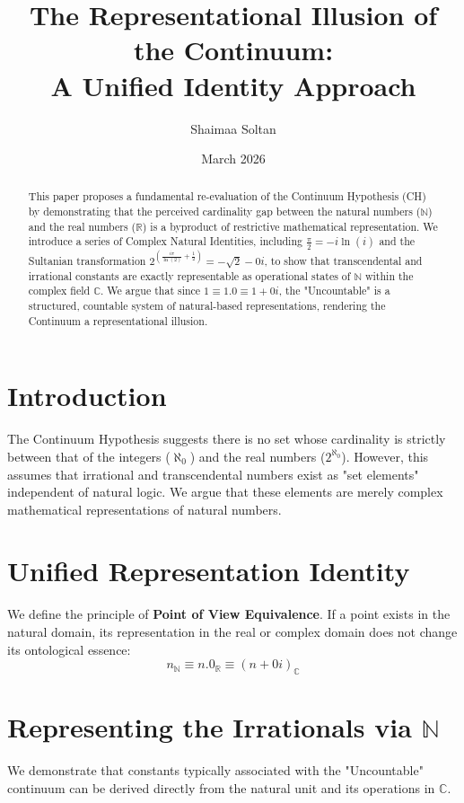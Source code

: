 \documentclass[12pt,a4paper]{article}
\title{The Representational Illusion of the Continuum: \\ A Unified Identity Approach}
\author{Shaimaa Soltan}
\date{March 2026}
\begin{document}
\maketitle

\begin{abstract}
This paper proposes a fundamental re-evaluation of the Continuum Hypothesis (CH) by demonstrating that the perceived cardinality gap between the natural numbers ($\mathbb{N}$) and the real numbers ($\mathbb{R}$) is a byproduct of restrictive mathematical representation. We introduce a series of Complex Natural Identities, including $\frac{\pi}{2} = -i \ln(i)$ and the Sultanian transformation $2^{(\frac{i\pi}{\ln(2)} + \frac{1}{2})} = -\sqrt{2}-0i$, to show that transcendental and irrational constants are exactly representable as operational states of $\mathbb{N}$ within the complex field $\mathbb{C}$. We argue that since $1 \equiv 1.0 \equiv 1+0i$, the "Uncountable" is a structured, countable system of natural-based representations, rendering the Continuum a representational illusion.
\end{abstract}

\section{Introduction}
The Continuum Hypothesis suggests there is no set whose cardinality is strictly between that of the integers ($\aleph_0$) and the real numbers ($2^{\aleph_0}$). However, this assumes that irrational and transcendental numbers exist as "set elements" independent of natural logic. We argue that these elements are merely complex mathematical representations of natural numbers.

\section{Unified Representation Identity}
We define the principle of \textbf{Point of View Equivalence}. If a point exists in the natural domain, its representation in the real or complex domain does not change its ontological essence:
\begin{equation}
    n_{\mathbb{N}} \equiv n.0_{\mathbb{R}} \equiv (n + 0i)_{\mathbb{C}}
\end{equation}

\section{Representing the Irrationals via $\mathbb{N}$}
We demonstrate that constants typically associated with the "Uncountable" continuum can be derived directly from the natural unit and its operations in $\mathbb{C}$.
\end{document}
